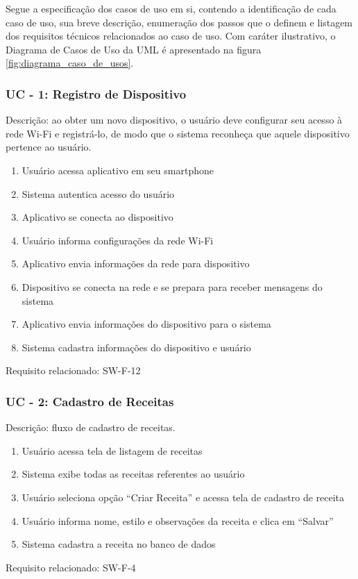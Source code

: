 Segue a especificação dos casos de uso em si, contendo a identificação de cada caso de uso, sua breve descrição, enumeração dos passos que o definem e 
listagem dos requisitos técnicos relacionados ao caso de uso. Com caráter ilustrativo, o Diagrama de Casos de Uso da UML é apresentado na figura \ref{fig:diagrama_caso_de_usos}.

\subsubsection*{UC - 1: Registro de Dispositivo} 

Descrição: ao obter um novo dispositivo, o usuário deve configurar seu acesso à rede Wi-Fi e registrá-lo, de modo que o sistema reconheça que aquele 
dispositivo pertence ao usuário.
\begin{enumerate}
    \item Usuário acessa aplicativo em seu smartphone
    \item Sistema autentica acesso do usuário
    \item Aplicativo se conecta ao dispositivo
    \item Usuário informa configurações da rede Wi-Fi
    \item Aplicativo envia informações da rede para dispositivo
    \item Dispositivo se conecta na rede e se prepara para receber mensagens do sistema
    \item Aplicativo envia informações do dispositivo para o sistema
    \item Sistema cadastra informações do dispositivo e usuário
\end{enumerate}
Requisito relacionado: SW-F-12

\subsubsection*{UC - 2: Cadastro de Receitas}
Descrição: fluxo de cadastro de receitas.
\begin{enumerate}
    \item Usuário acessa tela de listagem de receitas
    \item Sistema exibe todas as receitas referentes ao usuário
    \item Usuário seleciona opção “Criar Receita” e acessa tela de cadastro de receita
    \item Usuário informa nome, estilo e observações da receita e clica em “Salvar”
    \item Sistema cadastra a receita no banco de dados
\end{enumerate}
Requisito relacionado: SW-F-4

